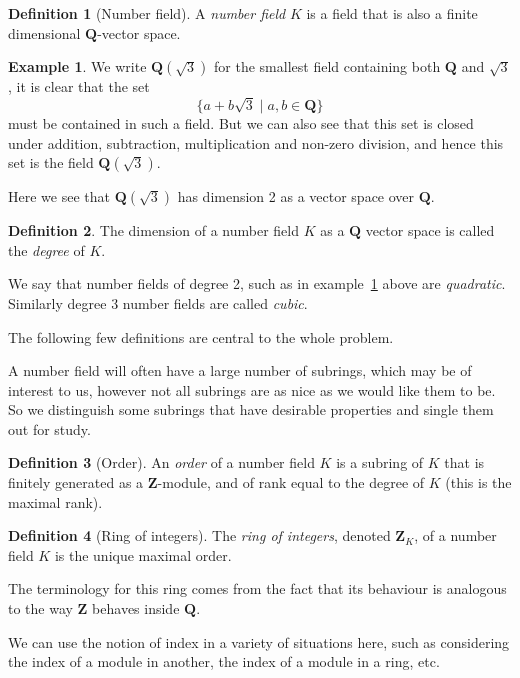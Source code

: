 \documentclass[a4paper,abstracton]{scrreprt}
\theoremstyle{definition}
\newtheorem{defn}{Definition}
\newtheorem{ex}{Example}
\newcommand{\QQ}{\mathbf{Q}}
\newcommand{\ZZ}{\mathbf{Z}}
\begin{document}
\begin{defn}[Number field]
A \emph{number field} $K$ is a field that is also a finite dimensional $\QQ$-vector space.
\end{defn}

\begin{ex}\label{ex:quad}
We write $\QQ(\sqrt{3})$ for the smallest field containing both $\QQ$ and $\sqrt{3}$, it is clear that the set
\[
\{a + b\sqrt{3}\mid a,b \in \QQ\}
\]
must be contained in such a field.
But we can also see that this set is closed under addition, subtraction, multiplication and non-zero division, and hence this set is the field $\QQ(\sqrt{3})$.

Here we see that $\QQ(\sqrt{3})$ has dimension 2 as a vector space over $\QQ$.
\end{ex}

\begin{defn}
The dimension of a number field $K$ as a $\QQ$ vector space is called the \emph{degree} of $K$.

We say that number fields of degree 2, such as in example~\ref{ex:quad} above are \emph{quadratic}.
Similarly degree 3 number fields are called \emph{cubic}.
\end{defn}

\minisec{}
The following few definitions are central to the whole problem.

A number field will often have a large number of subrings, which may be of interest to us, however not all subrings are as nice as we would like them to be.
So we distinguish some subrings that have desirable properties and single them out for study.

\begin{defn}[Order]
An \emph{order} of a number field $K$ is a subring of $K$ that is finitely generated as a $\ZZ$-module, and of rank equal to the degree of $K$ (this is the maximal rank).
\end{defn}


\begin{defn}[Ring of integers]
The \emph{ring of integers}, denoted $\ZZ_K$, of a number field $K$ is the unique maximal order.
\end{defn}

The terminology for this ring comes from the fact that its behaviour is analogous to the way $\ZZ$ behaves inside $\QQ$.

We can use the notion of index in a variety of situations here, such as considering the index of a module in another, the index of a module in a ring, etc.
\end{document}
